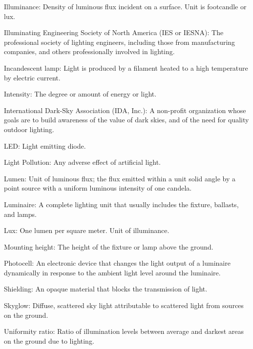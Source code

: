 \documentclass[12pt, oneside]{article}
\begin{document}
Illuminance: Density of luminous flux incident on a surface. Unit is footcandle or lux.

Illuminating Engineering Society of North America (IES or IESNA): The professional society of lighting engineers, including those from manufacturing companies, and others professionally involved in lighting.

Incandescent lamp: Light is produced by a filament heated to a high temperature by electric current.

Intensity: The degree or amount of energy or light.

International Dark-Sky Association (IDA, Inc.): A non-profit organization whose goals are to build awareness of the value of dark skies, and of the need for quality outdoor lighting.

LED: Light emitting diode.

Light Pollution: Any adverse effect of artificial light.

Lumen: Unit of luminous flux; the flux emitted within a unit solid angle by a point source with a uniform luminous intensity of one candela.

Luminaire: A complete lighting unit that usually includes the fixture, ballasts, and lamps.



Lux: One lumen per square meter. Unit of illuminance.

Mounting height: The height of the fixture or lamp above the ground.

Photocell: An electronic device that changes the light output of a luminaire dynamically in response to the ambient light level around the luminaire.

Shielding: An opaque material that blocks the transmission of light.

Skyglow: Diffuse, scattered sky light attributable to scattered light from sources on the ground.

Uniformity ratio: Ratio of illumination levels between average and darkest areas on the ground due to lighting.
\end{document}

